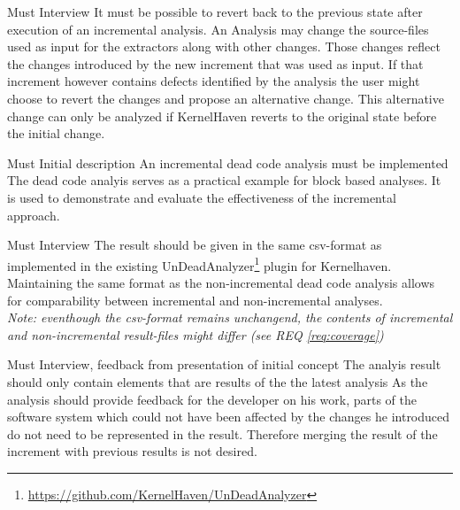 \documentclass[a4paper]{article}
\begin{document}
\begin{req} \label{req:rollback}
\reqtable
	{Must}  {Interview}
	{It must be possible to revert back to the previous state after execution of an incremental analysis.}
	{An Analysis may change the source-files used as input for the extractors along with other changes. Those changes reflect the changes introduced by the new increment that was used as input. If that increment however contains defects identified by the analysis the user might choose to revert the changes and propose an alternative change. This alternative change can only be analyzed if KernelHaven reverts to the original state before the initial change.}

\end{req}

\begin{req} 
\reqtable
	{Must}  {Initial description}
	{An incremental dead code analysis must be implemented}
	{The dead code analyis serves as a practical example for block based analyses. It is used to demonstrate and evaluate the effectiveness of the incremental approach.}
	
	

	
	\begin{subreq} \label{req:format}
    \reqtable
    {Must}  {Interview}
	{The result should be given in the same csv-format as implemented in the existing UnDeadAnalyzer\footnote{\url{https://github.com/KernelHaven/UnDeadAnalyzer}} plugin for Kernelhaven.}
	{Maintaining the same format as the non-incremental dead code analysis allows for comparability between incremental and non-incremental analyses. \\
	\emph{Note: eventhough the csv-format remains unchangend, the contents of incremental and non-incremental result-files might differ (see REQ \ref{req:coverage})}}
	\end{subreq}
	
	\begin{subreq} \label{req:coverage}
    \reqtable
    {Must}  {Interview, feedback from presentation of initial concept}
	{The analyis result should only contain elements that are results of the the latest analysis}
	{As the analysis should provide feedback for the developer on his work, parts of the software system which could not have been affected by the changes he introduced do not need to be represented in the result. Therefore merging the result of the increment with previous results is not desired.}
	\end{subreq}
\end{req}
\end{document}

